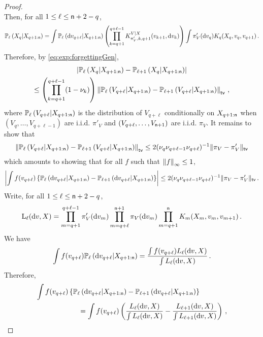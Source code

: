 \begin{proof}
\[\]
Then, for all $1\le \ell \le {\mathsf n}+2-q$,
\begin{equation*}
\bP_{\ell}\left(X_{q}\middle|X_{q+1:\nobs}\right) = \int \bP_{\ell}\left(\rmd v_{q+\ell}\middle | X_{q+1:\nobs}\right) \pa{\prod_{k = q+1}^{q+\ell-1}K^{V|X}_{\pi'_V,k,q+1}(v_{k+1},\rmd v_k)}\int\pi'_V(\rmd v_q)K_{q}(X_q,v_q,v_{q+1})\eqsp.
\end{equation*}
Therefore, by \eqref{eq:exp:forgettingGen},
\begin{multline*}
\left|\bP_{\ell}\left(X_{q}\middle|X_{q+1:\nobs}\right)-\bP_{\ell+1}\left(X_{q}\middle|X_{q+1:\nobs}\right)\right|\\
\le \left(\prod_{k = q+1}^{q+\ell-1}(1-\nu_k)\right)\norm{\bP_{\ell}\left(V_{q+\ell}\middle | X_{q+1:\nobs}\right)-\bP_{\ell+1}\left(V_{q+\ell}\middle | X_{q+1:\nobs}\right)}_{\mathsf{tv}}\eqsp,
\end{multline*}
where $\mathbb{P}_{\ell}\left(V_{q+\ell}\middle | X_{q+1:{\mathsf n}}\right)$ is the distribution of $V_{q+\ell}$ conditionally on $X_{q+1:{\mathsf n}}$ when $(V_q,\ldots,V_{q+\ell-1})$ are i.i.d. $\pi'_V$ and $(V_{q+\ell},\ldots,V_{{\mathsf n}+1})$ are i.i.d. $\pi_V$. It remains to show that 
\[
\left\|\mathbb{P}_{\ell}\left(V_{q+\ell}\middle | X_{q+1:{\mathsf n}}\right)-\mathbb{P}_{\ell+1}\left(V_{q+\ell}\middle | X_{q+1:{\mathsf n}}\right)\right\|_{\mathsf{tv}}\le  2(\nu_{q}\nu_{q+\ell-1}\nu_{q+\ell})^{-1} \|\pi_V-\pi'_V\|_{\mathsf{tv}}
\]
which amounts to showing that for all $f$ such that $\left\|f\right\|_\infty\le 1$,
\[
\left|\int f(v_{q+\ell})\left\{\mathbb{P}_{\ell}\left(\mathrm{d} v_{q+\ell}\middle | X_{q+1:{\mathsf n}}\right)-\mathbb{P}_{\ell+1}\left(\mathrm{d} v_{q+\ell}\middle | X_{q+1:{\mathsf n}}\right)\right\}\right|\le 2(\nu_{q}\nu_{q+\ell-1}\nu_{q+\ell})^{-1} \|\pi_V-\pi'_V\|_{\mathsf{tv}}\,.
\]
Write, for all $1\le \ell \le {\mathsf n}+2-q$,
\begin{equation}
\label{eq:defL}
\mathrm{L}_{\ell}(\rmd v,X)= \prod_{m=q+1}^{q+\ell-1}\pi'_V(\rmd v_m)\prod_{m=q+\ell}^{\nobs+1}\pi_V(\rmd v_m)\prod_{m=q+1}^{\nobs}K_m(X_{m},v_{m},v_{m+1})\eqsp.
\end{equation}
We have
\[
\int f(v_{q+\ell})\mathbb{P}_{\ell}\left(\mathrm{d} v_{q+\ell}\middle | X_{q+1:{\mathsf n}}\right)=\frac{\int f(v_{q+\ell})L_\ell(\mathrm{d} v,X)}{\int L_\ell(\mathrm{d} v,X)}\,.
\]
Therefore,
\begin{align*}
 \int f(v_{q+\ell})\left\{\bP_{\ell}\left(\rmd v_{q+\ell}\middle | X_{q+1:\nobs}\right)-\bP_{\ell+1}\left(\rmd v_{q+\ell}\middle | X_{q+1:\nobs}\right)\right\} &\\
 &\hspace{-6cm}=\int f(v_{q+\ell})\pa{\frac{L_\ell(\rmd v,X)}{\int L_\ell(\rmd v,X)}-\frac{L_{\ell+1}(\rmd v,X)}{\int L_{\ell+1}(\rmd v,X)}}\eqsp,\\

\end{align*}
\end{proof}
